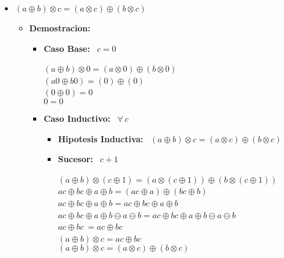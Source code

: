 \documentclass[10pt,a4paper]{article}
\begin{document}
\begin{itemize}
       
        \item{$(a\oplus b)\otimes c = (a\otimes c) \oplus (b \otimes c)$}
        \begin{itemize}
        \item \textbf{Demostracion:}
        \begin{itemize}
        \item \textbf{Caso Base: } \ $ c=0 $
        \begin{center}
        $(a\oplus b)\otimes 0 = (a\otimes 0) \oplus (b \otimes 0)$
        \
        \\ $ (a0\oplus b0) = (0)\oplus (0) $
        \
        \\ $ (0\oplus 0) = 0 $
        \
        \\ $ 0 = 0 $
        \end{center}
        \item \textbf{Caso Inductivo: } \ $ \forall\ c$ 
        \begin{itemize}
        \item \textbf{Hipotesis Inductiva: } \ $(a\oplus b)\otimes c = (a\otimes c) \oplus (b \otimes c)$
        \item \textbf{Sucesor:} \ $ c+1$
        \begin{center}
        $(a\oplus b)\otimes (c\oplus 1) = (a\otimes (c\oplus 1)) \oplus (b \otimes (c\oplus 1))$
        \
        \\ $ ac\oplus bc\oplus a\oplus b = (ac\oplus a)\oplus (bc\oplus b)$
        \
        \\ $ ac\oplus bc\oplus a\oplus b = ac\oplus bc\oplus a\oplus b $
        \
       	\\ $ ac\oplus bc\oplus a\oplus b\ominus a\ominus b = ac\oplus bc\oplus a\oplus b\ominus a\ominus b $
       	\
       	\\ $ ac\oplus bc\ = ac\oplus bc $
       	\
       	\\$ (a\oplus b)\otimes c = ac\oplus bc $
       	\
       	\\ $(a\oplus b)\otimes c = (a\otimes c) \oplus (b \otimes c)$
        \end{center}
        \end{itemize}
        \end{itemize}
        \end{itemize}
\end{itemize}
\end{document}
